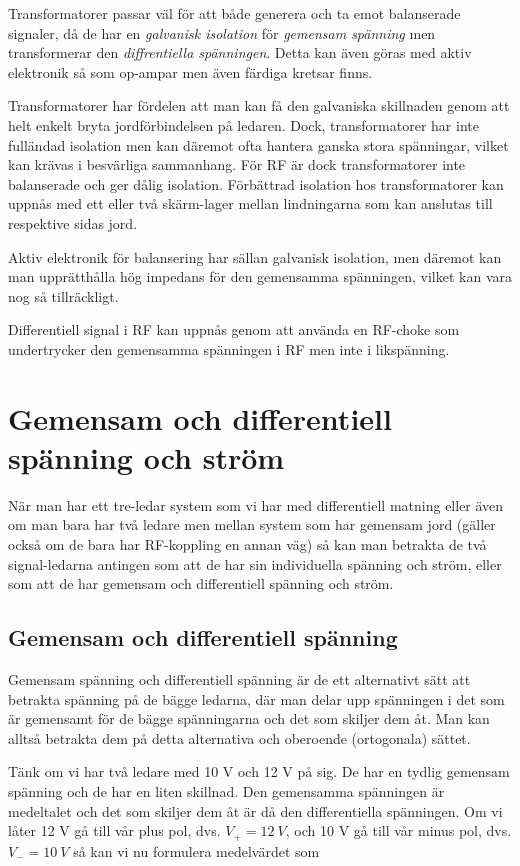 Transformatorer passar väl för att både generera och ta emot balanserade
signaler, då de har en \emph{galvanisk isolation} för \emph{gemensam spänning}
men transformerar den \emph{diffrentiella spänningen}. Detta kan även göras med
aktiv elektronik så som op-ampar men även färdiga kretsar finns.

Transformatorer har fördelen att man kan få den galvaniska skillnaden genom
att helt enkelt bryta jordförbindelsen på ledaren. Dock, transformatorer har
inte fulländad isolation men kan däremot ofta hantera ganska stora spänningar,
vilket kan krävas i besvärliga sammanhang. För RF är dock transformatorer inte
balanserade och ger dålig isolation. Förbättrad isolation hos transformatorer
kan uppnås med ett eller två skärm-lager mellan lindningarna som kan anslutas
till respektive sidas jord.

Aktiv elektronik för balansering har sällan galvanisk isolation, men däremot
kan man upprätthålla hög impedans för den gemensamma spänningen, vilket kan
vara nog så tillräckligt.

Differentiell signal i RF kan uppnås genom att använda en RF-choke som
undertrycker den gemensamma spänningen i RF men inte i likspänning.

\section{Gemensam och differentiell spänning och ström}

När man har ett tre-ledar system som vi har med differentiell matning eller
även om man bara har två ledare men mellan system som har gemensam jord
(gäller också om de bara har RF-koppling en annan väg) så kan man betrakta
de två signal-ledarna antingen som att de har sin individuella spänning och
ström, eller som att de har gemensam och differentiell spänning och ström.

\subsection{Gemensam och differentiell spänning}
\label{comdiffv}

Gemensam spänning och differentiell spänning är de ett alternativt sätt att
betrakta spänning på de bägge ledarna, där man delar upp spänningen i det som
är gemensamt för de bägge spänningarna och det som skiljer dem åt. Man kan
alltså betrakta dem på detta alternativa och oberoende (ortogonala) sättet.

Tänk om vi har två ledare med 10 V och 12 V på sig. De har en tydlig gemensam
spänning och de har en liten skillnad. Den gemensamma spänningen är medeltalet
och det som skiljer dem åt är då den differentiella spänningen. Om vi låter
12 V gå till vår plus pol, dvs. \(V_+ = 12\ V\), och 10 V gå till vår minus pol,
dvs. \(V_- = 10\ V\) så kan vi nu formulera medelvärdet som

